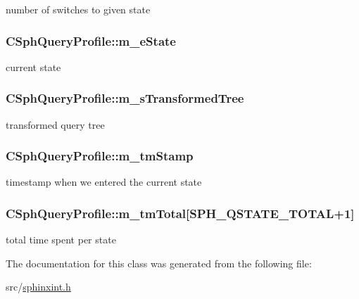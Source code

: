 number of switches to given state 

\hypertarget{classCSphQueryProfile_a51951e40aadac8284bf6bcc512de84a6}{
\subsubsection[{m\-\_\-e\-State}]{ C\-Sph\-Query\-Profile\-::m\-\_\-e\-State}}\label{classCSphQueryProfile_a51951e40aadac8284bf6bcc512de84a6}


current state 

\hypertarget{classCSphQueryProfile_a1b07b39dc8543da115ddce681cba4315}{
\subsubsection[{m\-\_\-s\-Transformed\-Tree}]{ C\-Sph\-Query\-Profile\-::m\-\_\-s\-Transformed\-Tree}}\label{classCSphQueryProfile_a1b07b39dc8543da115ddce681cba4315}


transformed query tree 

\hypertarget{classCSphQueryProfile_a59b27df0757e1d1a3087d83c14dfbee9}{
\subsubsection[{m\-\_\-tm\-Stamp}]{ C\-Sph\-Query\-Profile\-::m\-\_\-tm\-Stamp}}\label{classCSphQueryProfile_a59b27df0757e1d1a3087d83c14dfbee9}


timestamp when we entered the current state 

\hypertarget{classCSphQueryProfile_a314603ebfbe41b032c282ff047394cdd}{
\subsubsection[{m\-\_\-tm\-Total}]{ C\-Sph\-Query\-Profile\-::m\-\_\-tm\-Total\mbox{[}{\bf S\-P\-H\-\_\-\-Q\-S\-T\-A\-T\-E\-\_\-\-T\-O\-T\-A\-L}+1\mbox{]}}}\label{classCSphQueryProfile_a314603ebfbe41b032c282ff047394cdd}


total time spent per state 



The documentation for this class was generated from the following file\-:\begin{DoxyCompactItemize}
\item 
src/\hyperlink{sphinxint_8h}{sphinxint.\-h}\end{DoxyCompactItemize}
